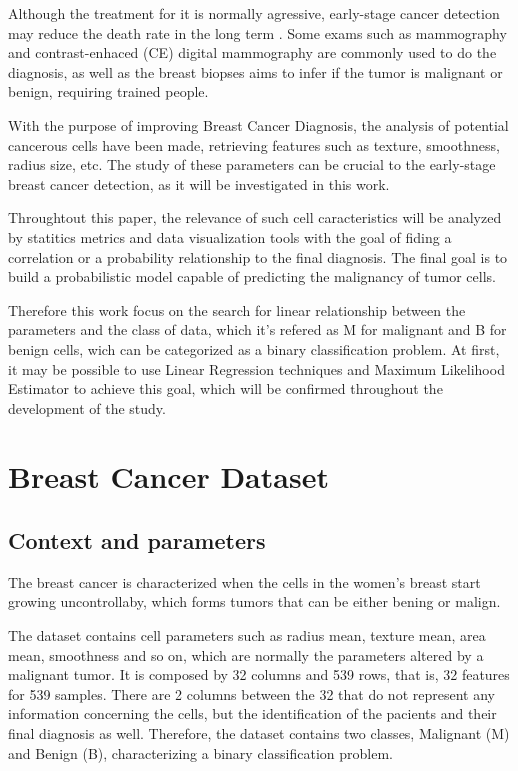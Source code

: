 \documentclass[conference]{IEEEtran}
\begin{document}
Although the treatment for it is normally agressive, early-stage cancer detection may reduce the death rate in the long term \cite{b1}. 
Some exams such as mammography and contrast-enhaced (CE) digital mammography are commonly used to do the diagnosis, 
as well as the breast biopses aims to infer if the tumor is malignant or benign, requiring trained people. 

With the purpose of improving Breast Cancer Diagnosis, the analysis of potential cancerous cells have been made,
retrieving features such as texture, smoothness, radius size, etc. The study of these parameters can be crucial 
to the early-stage breast cancer detection, as it will be investigated in this work. 

Throughtout this paper, the relevance of such cell caracteristics will be analyzed by statitics metrics and data visualization tools 
with the goal of fiding a correlation or a probability relationship to the final diagnosis. The final goal is to 
build a probabilistic model capable of predicting the malignancy of tumor cells.

Therefore this work focus on the search for linear relationship between the parameters 
and the class of data, which it's refered as M for malignant and B for benign cells, wich can be 
categorized as a binary classification problem. At first, it may be possible to use 
Linear Regression techniques and Maximum Likelihood Estimator to achieve this goal, which will be 
confirmed throughout the development of the study. 



\section{Breast Cancer Dataset}

\subsection{Context and parameters}

The breast cancer is characterized when the cells in the women's breast start
growing uncontrollaby, which forms tumors that can be either bening or malign. 

The dataset contains cell parameters such as radius mean, texture mean, area mean, 
smoothness and so on, which are normally the parameters altered by a malignant
tumor. 
It is composed by 32 columns and 539 rows, that is, 32 features 
for 539 samples. There are 2 columns between the 32 that do not represent any information 
concerning the cells, but the identification of the pacients and their final
diagnosis as well. Therefore, the dataset contains two classes, Malignant (M) and Benign (B),
characterizing a binary classification problem. 
\end{document}
